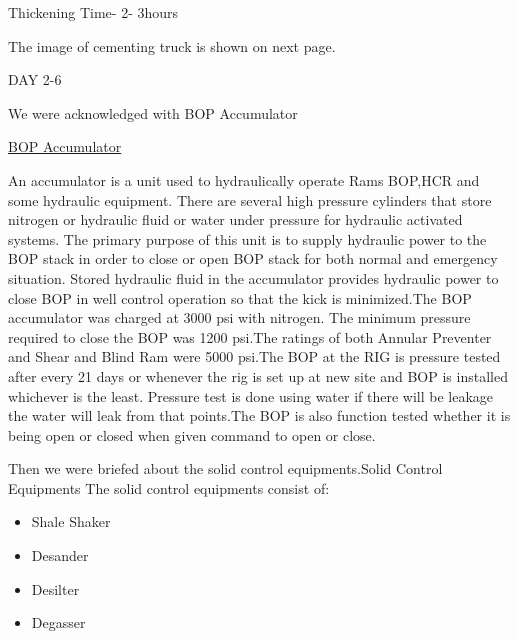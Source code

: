 \documentclass[11pt,a4paper]{article}
\begin{document}
Thickening Time- 2- 3hours

The image of cementing truck is shown on next page.

DAY 2-6

We were acknowledged with BOP Accumulator


\underline{BOP Accumulator}

An accumulator is a unit used to hydraulically operate Rams BOP,HCR and some hydraulic equipment. There are several high pressure cylinders that store nitrogen or hydraulic fluid or water under pressure for hydraulic activated systems. The primary purpose of this unit is to supply hydraulic power to the BOP stack in order to close or open BOP stack for both normal and emergency situation. Stored hydraulic fluid in the accumulator provides hydraulic power to close BOP in well control operation so that the kick is minimized.The BOP accumulator was charged at 3000 psi with nitrogen. The minimum pressure required to close the BOP was 1200 psi.The ratings of both Annular Preventer and Shear and Blind Ram were 5000 psi.The BOP at the RIG is pressure tested after every 21 days or whenever the rig is set up at new site and BOP is installed whichever is the least. Pressure test is done using water if there will be leakage the water will leak from that points.The BOP is also function tested whether it is being open or closed when given command to open or close.


\noindent Then we were briefed about the solid control equipments.Solid Control Equipments The solid control equipments consist of:

\begin{itemize}

\item Shale Shaker
\item Desander
\item Desilter
\item Degasser

\end{itemize}

 
\end{document}
